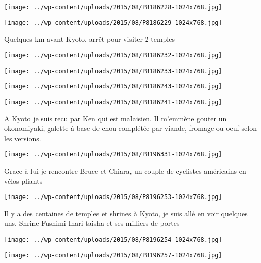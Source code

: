  \newline
\centerline{\texttt{[image: ../wp-content/uploads/2015/08/P8186228-1024x768.jpg]} } 
 \newline
 \newline
\centerline{\texttt{[image: ../wp-content/uploads/2015/08/P8186229-1024x768.jpg]} } 
 \newline
 Quelques km avant Kyoto, arrêt pour visiter 2 temples \newline
 \newline
\centerline{\texttt{[image: ../wp-content/uploads/2015/08/P8186232-1024x768.jpg]} } 
 \newline
 \newline
\centerline{\texttt{[image: ../wp-content/uploads/2015/08/P8186233-1024x768.jpg]} } 
 \newline
 \newline
\centerline{\texttt{[image: ../wp-content/uploads/2015/08/P8186243-1024x768.jpg]} } 
 \newline
 \newline
\centerline{\texttt{[image: ../wp-content/uploads/2015/08/P8186241-1024x768.jpg]} } 
 \newline
 A Kyoto je suis recu par Ken qui est malaisien. \newline
 Il m'emmène gouter un okonomiyaki, galette à base de chou complétée par viande, fromage ou oeuf selon les versions. \newline
 \newline
\centerline{\texttt{[image: ../wp-content/uploads/2015/08/P8196331-1024x768.jpg]} } 
 \newline
 Grace à lui je rencontre Bruce et Chiara, un couple de cyclistes américains en vélos pliants \newline
 \newline
\centerline{\texttt{[image: ../wp-content/uploads/2015/08/P8196253-1024x768.jpg]} } 
 \newline
 Il y a des centaines de temples et shrines à Kyoto, je suis allé en voir quelques uns. \newline
 Shrine Fushimi Inari-taisha et ses milliers de portes \newline
 \newline
\centerline{\texttt{[image: ../wp-content/uploads/2015/08/P8196254-1024x768.jpg]} } 
 \newline
 \newline
\centerline{\texttt{[image: ../wp-content/uploads/2015/08/P8196257-1024x768.jpg]} } 
